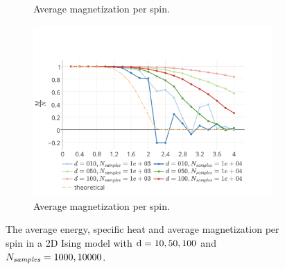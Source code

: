 \begin{figure}
\begin{subfigure}{\columnwidth}
		\caption{Average magnetization per spin.}
		\label{fig:results:2D:specificHeat}
	\end{subfigure}	
	\begin{subfigure}{\columnwidth}
		\centering
		\includegraphics[width=\textwidth]{./img/2D/averageMagnetization}
		\caption{Average magnetization per spin.}
		\label{fig:results:2D:averageMagnetization}
	\end{subfigure}		
	\caption{The  average energy,  specific heat and  average magnetization per spin in a 2D Ising model with $\mathrm{d} = 10, 50, 100$ and $N_\textit{samples} = 1000, 10000$.}
	\label{fig:results:2D}
\end{figure}